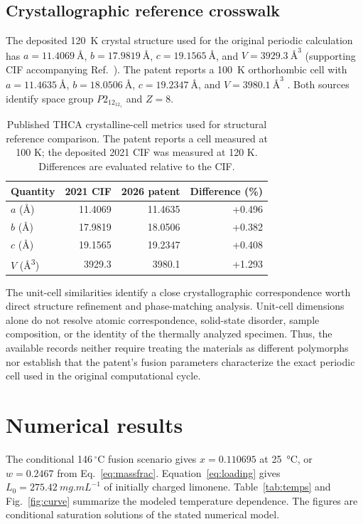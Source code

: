 \documentclass[10pt,a4paper,twocolumn]{article}
\begin{document}
\subsection{Crystallographic reference crosswalk}\label{sec:crosswalk}
The deposited \SI{120}{K} crystal structure used for the original periodic calculation has $a=\SI{11.4069}{\angstrom}$, $b=\SI{17.9819}{\angstrom}$, $c=\SI{19.1565}{\angstrom}$, and $V=\SI{3929.3}{\angstrom\cubed}$ (supporting CIF accompanying Ref.~\cite{skell}). The patent reports a \SI{100}{K} orthorhombic cell with $a=\SI{11.4635}{\angstrom}$, $b=\SI{18.0506}{\angstrom}$, $c=\SI{19.2347}{\angstrom}$, and $V=\SI{3980.1}{\angstrom\cubed}$ \cite{patent}. Both sources identify space group $P2_12_12_1$ and $Z=8$.

\begin{table}[t]
\centering
\caption{Published THCA crystalline-cell metrics used for structural reference comparison. The patent reports a cell measured at 100 K; the deposited 2021 CIF was measured at 120 K. Differences are evaluated relative to the CIF.}
\label{tab:lattice}
\footnotesize
\begin{tabular}{@{}lrrr@{}}
\toprule
Quantity & 2021 CIF & 2026 patent & Difference (\%)\\
\midrule
$a$ (\si{\angstrom}) & 11.4069 & 11.4635 & +0.496\\
$b$ (\si{\angstrom}) & 17.9819 & 18.0506 & +0.382\\
$c$ (\si{\angstrom}) & 19.1565 & 19.2347 & +0.408\\
$V$ (\si{\angstrom\cubed}) & 3929.3 & 3980.1 & +1.293\\
\bottomrule
\end{tabular}
\end{table}

The unit-cell similarities identify a close crystallographic correspondence worth direct structure refinement and phase-matching analysis. Unit-cell dimensions alone do not resolve atomic correspondence, solid-state disorder, sample composition, or the identity of the thermally analyzed specimen. Thus, the available records neither require treating the materials as different polymorphs nor establish that the patent's fusion parameters characterize the exact periodic cell used in the original computational cycle.

\section{Numerical results}\label{sec:results}
The conditional 146\,$^\circ$C fusion scenario gives $x=0.110695$ at \SI{25}{\celsius}, or $w=0.2467$ from Eq.~\ref{eq:massfrac}. Equation~\ref{eq:loading} gives $L_0=\SI{275.42}{mg.mL^{-1}}$ of initially charged limonene. Table~\ref{tab:temps} and Fig.~\ref{fig:curve} summarize the modeled temperature dependence. The figures are conditional saturation solutions of the stated numerical model.
\end{document}
